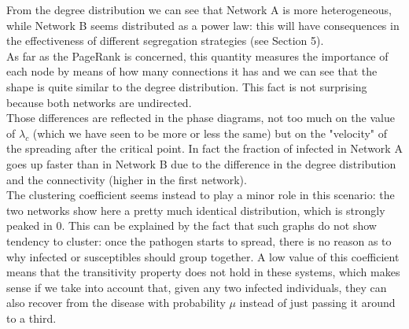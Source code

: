 \documentclass[a4paper,11pt]{article}
\begin{document}
From the degree distribution we can see that Network A is more heterogeneous, while Network B seems distributed as a power law: this will have consequences in the effectiveness of different segregation strategies (see Section 5).
\\
As far as the PageRank is concerned, this quantity measures the importance of each node by means of how many connections it has and we can see that the shape is quite similar to the degree distribution. This fact is not surprising because both networks are undirected.
\\
Those differences are reflected in the phase diagrams, not too much on the value of $\lambda_c$ (which we have seen to be more or less the same) but on the "velocity" of the spreading after the critical point. In fact the fraction of infected in Network A goes up faster than in Network B due to the difference in the degree distribution and the connectivity (higher in the first network).
\\
The clustering coefficient seems instead to play a minor role in this scenario: the two networks show here a pretty much identical distribution, which is strongly peaked in 0. This can be explained by the fact that such graphs do not show tendency to cluster: once the pathogen starts to spread, there is no reason as to why infected or susceptibles should group together. A low value of this coefficient means that the transitivity property does not hold in these systems, which makes sense if we take into account that, given any two infected individuals, they can also recover from the disease with probability $\mu$ instead of just passing it around to a third.
\end{document}
